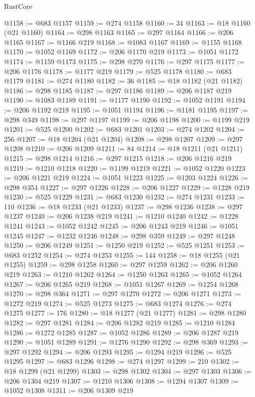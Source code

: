 \begin{lexlean}{RustCore}
\begin{coremodule}
@1158 := @683 @1157
@1159 := @274 @1158
@1160 := 34
@1163 := @18 @1160 (@21 @1160)
@1164 := @298 @1163
@1165 := @297 @1164
@1166 := @206 @1165
@1167 := @1166 @219
@1168 := @1083 @1167
@1169 := @1155 @1168
@1170 := @1052 @1169
@1172 := @206 @1170 @219
@1173 := @1051 @1172
@1174 := @1159 @1173
@1175 := @298 @270
@1176 := @297 @1175
@1177 := @206 @1176
@1178 := @1177 @219
@1179 := @525 @1178
@1180 := @683 @1179
@1181 := @274 @1180
@1182 := 36
@1185 := @18 @1182 (@21 @1182)
@1186 := @298 @1185
@1187 := @297 @1186
@1189 := @206 @1187 @219
@1190 := @1083 @1189
@1191 := @1177 @1190
@1192 := @1052 @1191
@1194 := @206 @1192 @219
@1195 := @1051 @1194
@1196 := @1181 @1195
@1197 := @298 @349
@1198 := @297 @1197
@1199 := @206 @1198
@1200 := @1199 @219
@1201 := @525 @1200
@1202 := @683 @1201
@1203 := @274 @1202
@1204 := 256
@1207 := @18 @1204 (@21 @1204)
@1208 := @298 @1207
@1209 := @297 @1208
@1210 := @206 @1209
@1211 := 84
@1214 := @18 @1211 (@21 @1211)
@1215 := @298 @1214
@1216 := @297 @1215
@1218 := @206 @1216 @219
@1219 := @1210 @1218
@1220 := @1199 @1219
@1221 := @1052 @1220
@1223 := @206 @1221 @219
@1224 := @1051 @1223
@1225 := @1203 @1224
@1226 := @298 @354
@1227 := @297 @1226
@1228 := @206 @1227
@1229 := @1228 @219
@1230 := @525 @1229
@1231 := @683 @1230
@1232 := @274 @1231
@1233 := 110
@1236 := @18 @1233 (@21 @1233)
@1237 := @298 @1236
@1238 := @297 @1237
@1240 := @206 @1238 @219
@1241 := @1210 @1240
@1242 := @1228 @1241
@1243 := @1052 @1242
@1245 := @206 @1243 @219
@1246 := @1051 @1245
@1247 := @1232 @1246
@1248 := @298 @359
@1249 := @297 @1248
@1250 := @206 @1249
@1251 := @1250 @219
@1252 := @525 @1251
@1253 := @683 @1252
@1254 := @274 @1253
@1255 := 144
@1258 := @18 @1255 (@21 @1255)
@1259 := @298 @1258
@1260 := @297 @1259
@1262 := @206 @1260 @219
@1263 := @1210 @1262
@1264 := @1250 @1263
@1265 := @1052 @1264
@1267 := @206 @1265 @219
@1268 := @1051 @1267
@1269 := @1254 @1268
@1270 := @298 @364
@1271 := @297 @1270
@1272 := @206 @1271
@1273 := @1272 @219
@1274 := @525 @1273
@1275 := @683 @1274
@1276 := @274 @1275
@1277 := 176
@1280 := @18 @1277 (@21 @1277)
@1281 := @298 @1280
@1282 := @297 @1281
@1284 := @206 @1282 @219
@1285 := @1210 @1284
@1286 := @1272 @1285
@1287 := @1052 @1286
@1289 := @206 @1287 @219
@1290 := @1051 @1289
@1291 := @1276 @1290
@1292 := @298 @369
@1293 := @297 @1292
@1294 := @206 @1293
@1295 := @1294 @219
@1296 := @525 @1295
@1297 := @683 @1296
@1298 := @274 @1297
@1299 := 210
@1302 := @18 @1299 (@21 @1299)
@1303 := @298 @1302
@1304 := @297 @1303
@1306 := @206 @1304 @219
@1307 := @1210 @1306
@1308 := @1294 @1307
@1309 := @1052 @1308
@1311 := @206 @1309 @219

\end{coremodule}
\end{lexlean}
